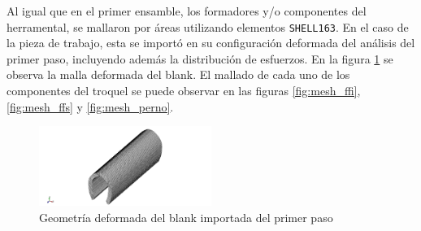




Al igual que en el primer ensamble, los formadores y/o componentes del herramental, se 
mallaron por áreas utilizando elementos \texttt{SHELL163}. En el caso de la pieza de trabajo, 
esta se importó en su configuración deformada del análisis del primer paso, incluyendo 
además la distribución de esfuerzos. En la figura \ref{fig:mesh_blank_02} se observa 
la malla deformada del blank. El mallado de cada uno de los componentes del troquel 
se puede observar en las figuras \ref{fig:mesh_ffi}, \ref{fig:mesh_ffs} y \ref{fig:mesh_perno}.


\begin{figure}[H]
\centering
\includegraphics[width=0.5\textwidth]{src/ch3/mesh_blank_02.png}
\caption{Geometría deformada del blank importada del primer paso}
\label{fig:mesh_blank_02}
\end{figure}

